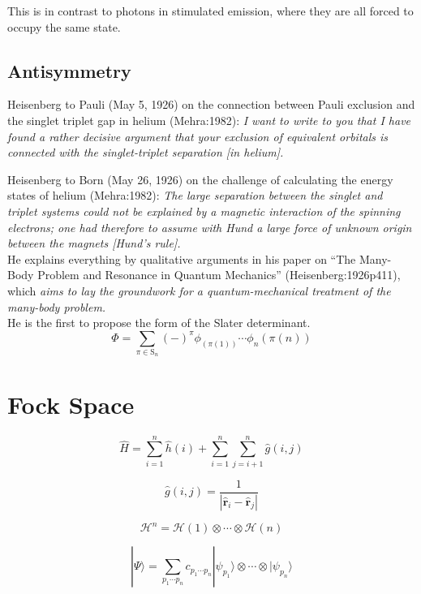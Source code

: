 This is in contrast to photons in stimulated emission, where they are all forced
to occupy the same state.

\subsection{Antisymmetry}

Heisenberg to Pauli (May 5, 1926) on the connection between Pauli exclusion and
the singlet triplet gap in helium (Mehra:1982):
{\itshape
    I want to write to you that I have found a rather decisive argument that
    your exclusion of equivalent orbitals is connected with the singlet-triplet
    separation [in helium].
}

Heisenberg to Born (May 26, 1926) on the challenge of calculating the energy
states of helium (Mehra:1982):
{\itshape
    The large separation between the singlet and triplet systems could not be
    explained by a magnetic interaction of the spinning electrons; one had
    therefore to assume with Hund a large force of unknown origin between the
    magnets [Hund's rule].
}
\\
He explains everything by qualitative arguments in his paper on ``The Many-Body
Problem and Resonance in Quantum Mechanics'' (Heisenberg:1926p411), which
{\itshape
    aims to lay the groundwork for a quantum-mechanical treatment of the
    many-body problem.
}
\\
He is the first to propose the form of the Slater determinant.
\begin{equation}
    \Phi
    =
    \sum_{\pi\in\mathrm{S}_n}
    (-)^\pi
    \phi_(\pi(1))
    \cdots
    \phi_n(\pi(n))
\end{equation}



\section{Fock Space}

\begin{equation}
    \hat{H}
    =
    \sum_{i=1}^n
    \hat{h}(i)
    +
    \sum_{i=1}^n
    \sum_{j=i+1}^n
    \hat{g}(i,j)
\end{equation}

\begin{equation}
    \hat{g}(i,j)
    =
    \frac{1}{|\hat{\mathbf{r}}_i-\hat{\mathbf{r}}_j|}
\end{equation}

\begin{equation}
    \mathcal{H}^n
    =
    \mathcal{H}(1)\otimes\cdots\otimes\mathcal{H}(n)
\end{equation}

\begin{equation}
    |\Psi\rangle
    =
    \sum_{p_1\cdots p_n}
    c_{p_1\cdots p_n}
    |\psi_{p_1}\rangle
    \otimes
    \cdots
    \otimes
    |\psi_{p_n}\rangle
\end{equation}
